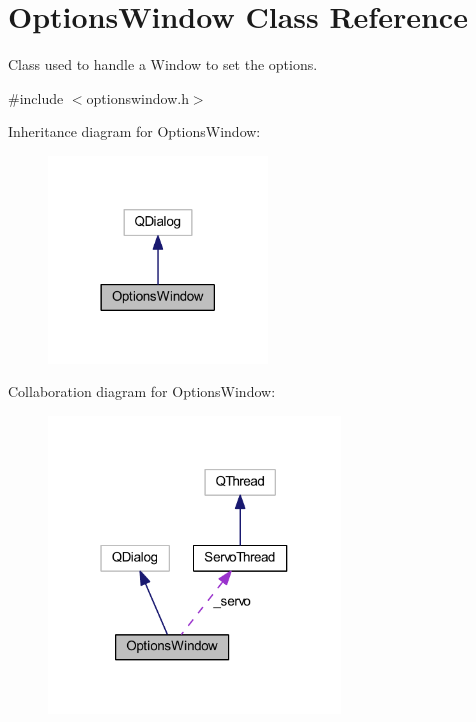 \hypertarget{class_options_window}{}\section{Options\+Window Class Reference}
\label{class_options_window}


Class used to handle a Window to set the options.  




{\ttfamily \#include $<$optionswindow.\+h$>$}



Inheritance diagram for Options\+Window\+:\nopagebreak
\begin{figure}[H]
\begin{center}
\leavevmode
\includegraphics[width=165pt]{d3/d77/class_options_window__inherit__graph}
\end{center}
\end{figure}


Collaboration diagram for Options\+Window\+:\nopagebreak
\begin{figure}[H]
\begin{center}
\leavevmode
\includegraphics[width=220pt]{dd/d04/class_options_window__coll__graph}
\end{center}
\end{figure}
